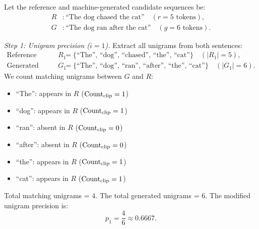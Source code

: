 \documentclass[../../main.tex]{subfiles}
\begin{document}
Let the reference and machine-generated candidate sequences be:
\begin{align*}
R &: \text{``The dog chased the cat''} \quad (r = 5 \text{ tokens}), \\
G &: \text{``The dog ran after the cat''} \quad (g = 6 \text{ tokens}).
\end{align*}

\textit{Step 1: Unigram precision ($i = 1$).}
Extract all unigrams from both sentences:
\begin{align*}
\text{Reference unigrams } R_1 &= \{\text{``The''}, \, \text{``dog''}, \, \text{``chased''}, \, \text{``the''}, \, \text{``cat''}\} \quad (|R_1| = 5), \\
\text{Generated unigrams } G_1 &= \{\text{``The''}, \, \text{``dog''}, \, \text{``ran''}, \, \text{``after''}, \, \text{``the''}, \, \text{``cat''}\} \quad (|G_1| = 6).
\end{align*}
We count matching unigrams between $G$ and $R$:
\begin{itemize}
    \item ``The'': appears in $R$ ($\operatorname{Count}_{\text{clip}} = 1$)
    \item ``dog'': appears in $R$ ($\operatorname{Count}_{\text{clip}} = 1$)
    \item ``ran'': absent in $R$ ($\operatorname{Count}_{\text{clip}} = 0$)
    \item ``after'': absent in $R$ ($\operatorname{Count}_{\text{clip}} = 0$)
    \item ``the'': appears in $R$ ($\operatorname{Count}_{\text{clip}} = 1$)
    \item ``cat'': appears in $R$ ($\operatorname{Count}_{\text{clip}} = 1$)
\end{itemize}
Total matching unigrams = 4. The total generated unigrams = 6. The modified unigram precision is:
\begin{equation}
p_1 = \frac{4}{6} \approx \mathbf{0.6667}.
\end{equation}
\end{document}
